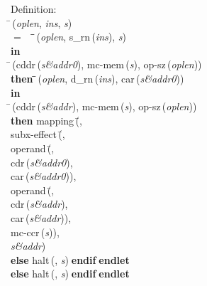 \begin{tabbing}{\sc Definition}: \\  
\=\,({\it{oplen\/}}, {\it{ins\/}}, {\it{s\/}}) \\ 
$=$$\;\;\;\;$\=\=\,({\it{oplen\/}}, {\rm{s\_rn}}\,({\it{ins\/}}), {\it{s\/}})\- \\ 
{\bf in} \\ 
\=\,({\rm{cddr}}\,({\it{s\&addr0\/}}), {\rm{mc-mem}}\,({\it{s\/}}), {\rm{op-sz}}\,({\it{oplen\/}})) \\ 
{\bf then }\=\=\,({\it{oplen\/}}, {\rm{d\_rn}}\,({\it{ins\/}}), {\rm{car}}\,({\it{s\&addr0\/}}))\- \\ 
{\bf in} \\ 
\=\,({\rm{cddr}}\,({\it{s\&addr\/}}), {\rm{mc-mem}}\,({\it{s\/}}), {\rm{op-sz}}\,({\it{oplen\/}})) \\ 
{\bf then }{\rm{mapping}}\,(\=, \\ 
{\rm{subx-effect}}\,(\=, \\ 
{\rm{operand}}\,(\=, \\ 
{\rm{cdr}}\,({\it{s\&addr0\/}}), \\ 
{\rm{car}}\,({\it{s\&addr0\/}}))\-, \\ 
{\rm{operand}}\,(\=, \\ 
{\rm{cdr}}\,({\it{s\&addr\/}}), \\ 
{\rm{car}}\,({\it{s\&addr\/}}))\-, \\ 
{\rm{mc-ccr}}\,({\it{s\/}}))\-, \\ 
{\it{s\&addr\/}})\- \\ 
{\bf else }{\rm{halt}}\,({}, {\it{s\/}})$\;${\bf  endif}\-$\;${\bf  endlet}\- \\ 
{\bf else }{\rm{halt}}\,({}, {\it{s\/}})$\;${\bf  endif}\-$\;${\bf  endlet}\-\-
\end{tabbing}

